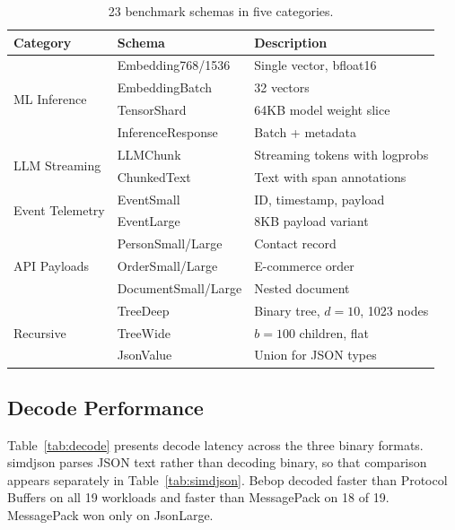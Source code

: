 \documentclass[10pt,onecolumn]{article}
\begin{document}
\begin{table}[ht]
\centering
\small
\begin{tabular}{@{}lll@{}}
\toprule
\textbf{Category} & \textbf{Schema} & \textbf{Description} \\
\midrule
\multirow{4}{*}{ML Inference}
  & Embedding768/1536 & Single vector, bfloat16 \\
  & EmbeddingBatch & 32 vectors \\
  & TensorShard & 64KB model weight slice \\
  & InferenceResponse & Batch + metadata \\
\midrule
\multirow{2}{*}{LLM Streaming}
  & LLMChunk & Streaming tokens with logprobs \\
  & ChunkedText & Text with span annotations \\
\midrule
\multirow{2}{*}{Event Telemetry}
  & EventSmall & ID, timestamp, payload \\
  & EventLarge & 8KB payload variant \\
\midrule
\multirow{3}{*}{API Payloads}
  & PersonSmall/Large & Contact record \\
  & OrderSmall/Large & E-commerce order \\
  & DocumentSmall/Large & Nested document \\
\midrule
\multirow{3}{*}{Recursive}
  & TreeDeep & Binary tree, $d{=}10$, 1023 nodes \\
  & TreeWide & $b{=}100$ children, flat \\
  & JsonValue & Union for JSON types \\
\bottomrule
\end{tabular}
\caption{23 benchmark schemas in five categories.}
\end{table}

\subsection{Decode Performance}

Table~\ref{tab:decode} presents decode latency across the three binary formats. simdjson parses JSON text rather than decoding binary, so that comparison appears separately in Table~\ref{tab:simdjson}. Bebop decoded faster than Protocol Buffers on all 19 workloads and faster than MessagePack on 18 of 19. MessagePack won only on JsonLarge.
\end{document}
